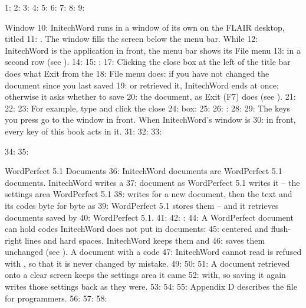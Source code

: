 1: %
2: %
3: %
4: %
5: %
6: %
7: %
8: 
9: \begin{Feature}{Window}
10: InitechWord runs in a window of its own on the FLAIR desktop, titled
11: .  The window fills the screen below the menu bar.  While
12: InitechWord is the application in front, the menu bar shows its File menu
13: in a second row (see ).
14: 
15: : 
17: Clicking the close box at the left of the title bar does what Exit from the
18: File menu does: if you have not changed the document since you last saved
19: or retrieved it, InitechWord ends at once; otherwise it asks whether to save
20: the document, as Exit (F7) does (see ).
21: 
22: 
23: For example, type  and click the close
24: box\CloseBox:
25: 
26: : 
28: 
29: The keys you press go to the window in front.  When InitechWord's window is
30: in front, every key of this book acts in it.
31: 
32: 
33: \end{Feature}
34: 
35: \begin{Feature}{WordPerfect 5.1 Documents}
36: InitechWord documents are WordPerfect 5.1 documents.  InitechWord writes a
37: document as WordPerfect 5.1 writes it -- the settings area WordPerfect 5.1
38: writes for a new document, then the text and its codes byte for byte as
39: WordPerfect 5.1 stores them -- and it retrieves documents saved by
40: WordPerfect 5.1.
41: 
42: : 
44: A WordPerfect document can hold codes InitechWord does not put in documents:
45: centered and flush-right lines and hard spaces.  InitechWord keeps them and
46: saves them unchanged (see ).  A document with a code
47: InitechWord cannot read is refused with , so that it is never changed by mistake.
49: 
50: 
51: A document retrieved onto a clear screen keeps the settings area it came
52: with, so saving it again writes those settings back as they were.
53: 
54: 
55: Appendix D describes the file for programmers.
56: 
57: 
58: \end{Feature}
